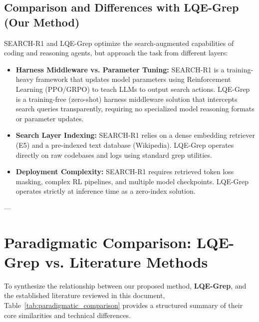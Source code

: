 \documentclass[11pt,a4paper]{article}
\begin{document}
\subsection{Comparison and Differences with LQE-Grep (Our Method)}
SEARCH-R1 and LQE-Grep optimize the search-augmented capabilities of coding and reasoning agents, but approach the task from different layers:
\begin{itemize}
    \item \textbf{Harness Middleware vs. Parameter Tuning:} SEARCH-R1 is a training-heavy framework that updates model parameters using Reinforcement Learning (PPO/GRPO) to teach LLMs to output search actions. LQE-Grep is a training-free (zero-shot) harness middleware solution that intercepts search queries transparently, requiring no specialized model reasoning formats or parameter updates.
    \item \textbf{Search Layer Indexing:} SEARCH-R1 relies on a dense embedding retriever (E5) and a pre-indexed text database (Wikipedia). LQE-Grep operates directly on raw codebases and logs using standard grep utilities.
    \item \textbf{Deployment Complexity:} SEARCH-R1 requires retrieved token loss masking, complex RL pipelines, and multiple model checkpoints. LQE-Grep operates strictly at inference time as a zero-index solution.
\end{itemize}

---

\newpage
\section{Paradigmatic Comparison: LQE-Grep vs. Literature Methods}
\label{sec:comparison}

To synthesize the relationship between our proposed method, \textbf{LQE-Grep}, and the established literature reviewed in this document, Table~\ref{tab:paradigmatic_comparison} provides a structured summary of their core similarities and technical differences.
\end{document}
